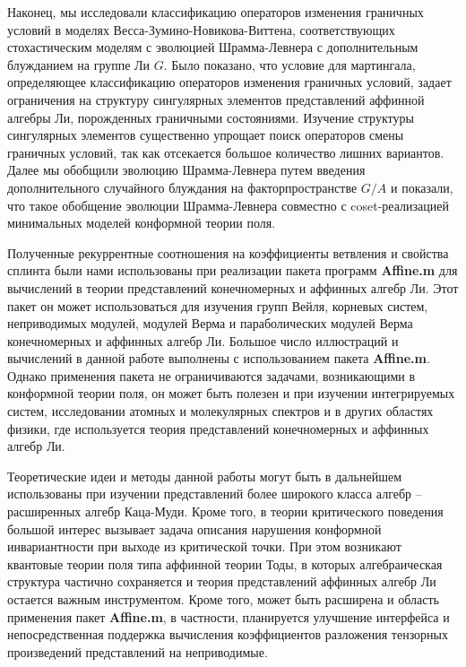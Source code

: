 Наконец, мы исследовали классификацию операторов изменения граничных условий в моделях Весса-Зумино-Новикова-Виттена, соответствующих стохастическим моделям с эволюцией Шрамма-Левнера с дополнительным блужданием на группе Ли $G$. Было показано, что условие для мартингала, определяющее классификацию операторов изменения граничных условий, задает ограничения на структуру сингулярных элементов представлений аффинной алгебры Ли, порожденных граничными состояниями. Изучение структуры сингулярных элементов существенно упрощает поиск операторов смены граничных условий, так как отсекается большое количество лишних вариантов. Далее мы обобщили эволюцию Шрамма-Левнера путем введения дополнительного случайного блуждания на факторпространстве $G/A$ и показали, что такое обобщение эволюции Шрамма-Левнера совместно с coset-реализацией минимальных моделей конформной теории поля. 

Полученные рекуррентные соотношения на коэффициенты ветвления и свойства сплинта были нами использованы при реализации пакета программ {\bf Affine.m}  для вычислений в теории представлений конечномерных и аффинных алгебр Ли. Этот пакет он может использоваться для изучения групп Вейля, корневых систем, неприводимых модулей, модулей Верма и параболических модулей Верма конечномерных и аффинных алгебр Ли. Большое число иллюстраций и вычислений в данной работе выполнены с использованием пакета  {\bf Affine.m}. Однако применения пакета не ограничиваются задачами, возникающими в конформной теории поля, он может быть полезен и при изучении интегрируемых систем, исследовании атомных и молекулярных спектров и в других областях физики, где используется теория представлений конечномерных и аффинных алгебр Ли. 

Теоретические идеи и методы данной работы могут быть в дальнейшем использованы при изучении представлений более широкого класса алгебр -- расширенных алгебр Каца-Муди. Кроме того, в теории критического поведения большой интерес вызывает задача описания нарушения конформной инвариантности при выходе из критической точки. При этом возникают квантовые теории поля типа аффинной теории Тоды, в которых алгебраическая структура частично сохраняется и теория представлений аффинных алгебр Ли остается важным инструментом. Кроме того, может быть расширена и область применения пакет {\bf Affine.m}, в частности, планируется улучшение интерфейса и непосредственная поддержка вычисления коэффициентов разложения тензорных произведений представлений на неприводимые. 


